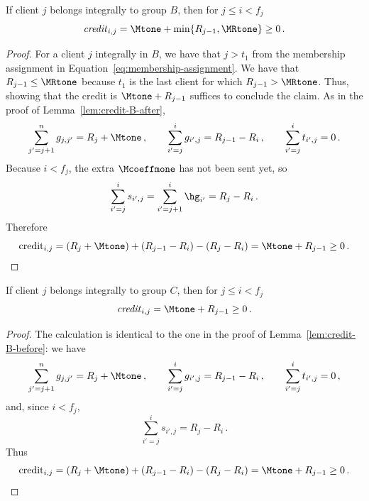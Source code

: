 \begin{lemma}
    \label{lem:credit-B-before}
    If client $j$ belongs integrally to group $B$, then for $j \leq i < f_j$
    \begin{equation*}
        \text{\emph{credit}}_{i,j} = \Mtone + \min\{R_{j-1},\MRtone\} \ge 0\,.
    \end{equation*}
\end{lemma}
\begin{proof}
    For a client $j$ integrally in $B$, we have that $j>t_1$ from the membership assignment in Equation~\ref{eq:membership-assignment}. We have that $R_{j-1} \le \MRtone$ because $t_1$ is the last client for which $R_{j-1} > \MRtone$. Thus, showing that the credit is $\Mtone + R_{j-1}$ suffices to conclude the claim. As in the proof of Lemma~\ref{lem:credit-B-after},
    \begin{equation*}
        \sum_{j'=j+1}^n g_{j,j'} = R_j+\Mtone\,,
        \qquad
        \sum_{i'=j}^{i} g_{i',j} = R_{j-1}-R_i\,,
        \qquad
        \sum_{i'=j}^{i} t_{i',j}=0\,.
    \end{equation*}
    Because $i<f_j$, the extra $\Mcoeffmone$ has not been sent yet, so
    \begin{equation*}
        \sum_{i'=j}^{i} s_{i',j} = \sum_{i'=j+1}^{i} \hg_{i'} = R_j-R_i\,.
    \end{equation*}
    Therefore
    \begin{equation*}
        \text{credit}_{i,j} = (R_j+\Mtone) + (R_{j-1}-R_i) - (R_j-R_i) = \Mtone + R_{j-1} \ge 0\,.
    \end{equation*}
\end{proof}

\begin{lemma}
    \label{lem:credit-C-before}
    If client $j$ belongs integrally to group $C$, then for $j \leq i < f_j$
    \begin{equation*}
        \text{\emph{credit}}_{i,j} = \Mtone + R_{j-1} \ge 0\,.
    \end{equation*}
\end{lemma}
\begin{proof}
    The calculation is identical to the one in the proof of Lemma~\ref{lem:credit-B-before}: we have
    \begin{equation*}
        \sum_{j'=j+1}^n g_{j,j'} = R_j+\Mtone\,,
        \qquad
        \sum_{i'=j}^{i} g_{i',j} = R_{j-1}-R_i\,,
        \qquad
        \sum_{i'=j}^{i} t_{i',j}=0\,,
    \end{equation*}
    and, since $i<f_j$,
    \begin{equation*}
        \sum_{i'=j}^{i} s_{i',j} = R_j-R_i\,.
    \end{equation*}
    Thus
    \begin{equation*}
        \text{credit}_{i,j} = (R_j+\Mtone) + (R_{j-1}-R_i) - (R_j-R_i) = \Mtone + R_{j-1} \ge 0\,.
    \end{equation*}
\end{proof}


